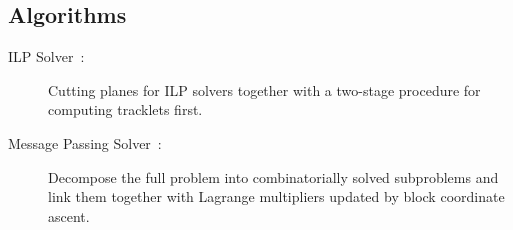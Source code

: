 \subsection{Algorithms}
\begin{description}
    \item[ILP Solver~\cite{hornakova2020lifted}:] Cutting planes for ILP solvers together with a two-stage procedure for computing tracklets first.
    \item[Message Passing Solver~\cite{hornakova2021making}:] Decompose the full problem into combinatorially solved subproblems and link them together with Lagrange multipliers updated by block coordinate ascent.
\end{description}
